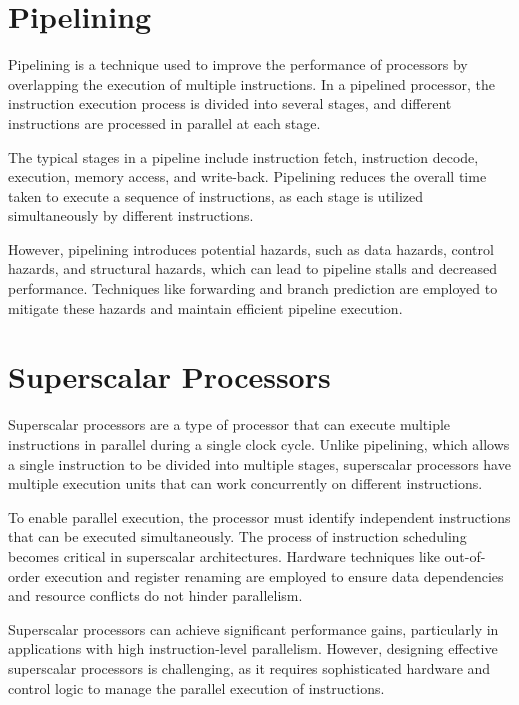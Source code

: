 \documentclass{article}
\begin{document}
\section{Pipelining}

Pipelining is a technique used to improve the performance of processors by overlapping the execution of multiple instructions. In a pipelined processor, the instruction execution process is divided into several stages, and different instructions are processed in parallel at each stage.

The typical stages in a pipeline include instruction fetch, instruction decode, execution, memory access, and write-back. Pipelining reduces the overall time taken to execute a sequence of instructions, as each stage is utilized simultaneously by different instructions.

However, pipelining introduces potential hazards, such as data hazards, control hazards, and structural hazards, which can lead to pipeline stalls and decreased performance. Techniques like forwarding and branch prediction are employed to mitigate these hazards and maintain efficient pipeline execution.

\section{Superscalar Processors}

Superscalar processors are a type of processor that can execute multiple instructions in parallel during a single clock cycle. Unlike pipelining, which allows a single instruction to be divided into multiple stages, superscalar processors have multiple execution units that can work concurrently on different instructions.

To enable parallel execution, the processor must identify independent instructions that can be executed simultaneously. The process of instruction scheduling becomes critical in superscalar architectures. Hardware techniques like out-of-order execution and register renaming are employed to ensure data dependencies and resource conflicts do not hinder parallelism.

Superscalar processors can achieve significant performance gains, particularly in applications with high instruction-level parallelism. However, designing effective superscalar processors is challenging, as it requires sophisticated hardware and control logic to manage the parallel execution of instructions.

\newpage
\end{document}
